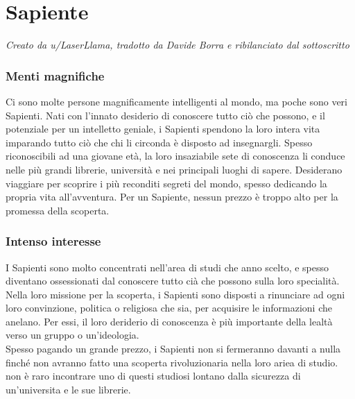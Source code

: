 \chapter{Sapiente}
\textit{Creato da u/LaserLlama, tradotto da Davide Borra e ribilanciato dal sottoscritto}

\subsection{Menti magnifiche}
Ci sono molte persone magnificamente intelligenti al mondo, ma poche sono veri Sapienti. Nati con l'innato desiderio di conoscere tutto ciò che possono, e il potenziale per un intelletto geniale, i Sapienti spendono la loro intera vita imparando tutto ciò che chi li circonda è disposto ad insegnargli. Spesso riconoscibili ad una giovane età, la loro insaziabile sete di conoscenza li conduce nelle più grandi librerie, università e nei principali luoghi di sapere. Desiderano viaggiare per scoprire i più reconditi segreti del mondo, spesso dedicando la propria vita all'avventura. Per un Sapiente, nessun prezzo è troppo alto per la promessa della scoperta.

\subsection{Intenso interesse}
I Sapienti sono molto concentrati nell'area di studi che anno scelto, e spesso diventano ossessionati dal conoscere tutto cià che possono sulla loro specialità. Nella loro missione per la scoperta, i Sapienti sono disposti a rinunciare ad ogni loro convinzione, politica o religiosa che sia, per acquisire le informazioni che anelano. Per essi, il loro deriderio di conoscenza è più importante della lealtà verso un gruppo o un'ideologia. \\
Spesso pagando un grande prezzo, i Sapienti non si fermeranno davanti a nulla finché non avranno fatto una scoperta rivoluzionaria nella loro ariea di studio. non è raro incontrare uno di questi studiosi lontano dalla sicurezza di un'universita e le sue librerie.

